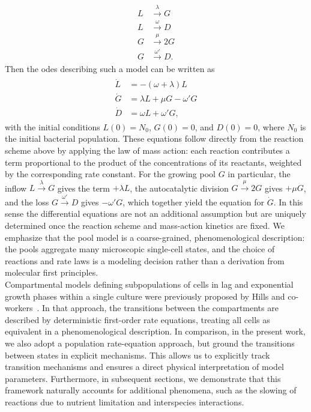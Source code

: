 \documentclass[10pt,1p,authoryear]{elsarticle}
\numberwithin{equation}{section}
\begin{document}
\begin{align}
\begin{split}
    L &\stackrel{\lambda}{\longrightarrow} G\\
    L &\stackrel{\omega}{\longrightarrow} D\\
    G &\stackrel{\mu}{\longrightarrow} 2G\\
    G &\stackrel{\omega'}{\longrightarrow} D.
\end{split}
\end{align}
Then the \acp{ode} describing such a model can be written as
\begin{align}\begin{split}
    \dot{L} &= -(\omega + \lambda) L\\
    \dot{G} &= \lambda L + \mu G - \omega' G\\
    \dot{D} &= \omega  L + \omega' G,
\end{split}\end{align}
with the initial conditions $L(0)=N_0$, $G(0)=0$, and $D(0)=0$, where $N_0$ is the initial bacterial population.
These equations follow directly from the reaction scheme above by applying the
law of mass action: each reaction contributes a term proportional to the product
of the concentrations of its reactants, weighted by the corresponding rate
constant. For the growing pool $G$ in particular, the inflow $L\xrightarrow{\lambda}G$
gives the term $+\lambda L$, the autocatalytic division $G\xrightarrow{\mu}2G$
gives $+\mu G$, and the loss $G\xrightarrow{\omega'}D$ gives $-\omega' G$, which
together yield the equation for $\dot{G}$. In this sense the differential
equations are not an additional assumption but are uniquely determined once the
reaction scheme and mass-action kinetics are fixed. We emphasize that the pool
model is a coarse-grained, phenomenological description: the pools aggregate many
microscopic single-cell states, and the choice of reactions and rate laws is a
modeling decision rather than a derivation from molecular first principles.\\
%
Compartmental models defining subpopulations of cells in lag and exponential growth phases within a single culture were previously proposed by Hills and co-workers~\citep{hills1995multicompartment, hills2001power}.
In that approach, the transitions between the compartments are described by deterministic first-order rate equations, treating all cells as equivalent in a phenomenological description.
In comparison, in the present work, we also adopt a population rate-equation approach, but ground the transitions between states in explicit mechanisms.
This allows us to explicitly track transition mechanisms and ensures a direct physical interpretation of model parameters. Furthermore, in subsequent sections, we demonstrate that this framework naturally accounts for additional phenomena, such as the slowing of reactions due to nutrient limitation and interspecies interactions.
%
\end{document}
